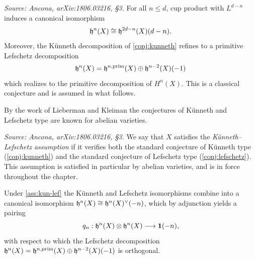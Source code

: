 \begin{conjecture}
  \label{conj:lefschetz}
  \textit{Source: Ancona, arXiv:1806.03216, §3.}
  For all \(n \leq d\), cup product with \(L^{d-n}\) induces a canonical
  isomorphism
  \[\mathfrak{h}^n(X) \cong \mathfrak{h}^{2d-n}(X)(d-n).\]
  Moreover, the K\"unneth decomposition of \cref{conj:kunneth} refines to a
  primitive Lefschetz decomposition
  \[\mathfrak{h}^n(X) = \mathfrak{h}^{n,\mathrm{prim}}(X) \oplus \mathfrak{h}^{n-2}(X)(-1)\]
  which realizes to the primitive decomposition of \(H^n(X)\). This is a
  classical conjecture and is assumed in what follows.
\end{conjecture}

\begin{remark}
  By the work of Lieberman and Kleiman the conjectures of K\"unneth and Lefschetz
  type are known for abelian varieties.
\end{remark}

\begin{definition}
  \label{ass:kun-lef}
  \textit{Source: Ancona, arXiv:1806.03216, §3.}
  We say that \(X\) satisfies the \emph{K\"unneth--Lefschetz assumption} if it
  verifies both the standard conjecture of K\"unneth type (\cref{conj:kunneth})
  and the standard conjecture of Lefschetz type (\cref{conj:lefschetz}). This
  assumption is satisfied in particular by abelian varieties, and is in force
  throughout the chapter.
\end{definition}

\begin{remark}
  Under \cref{ass:kun-lef} the K\"unneth and Lefschetz isomorphisms combine into
  a canonical isomorphism \(\mathfrak{h}^n(X) \cong \mathfrak{h}^{n}(X)^{\vee}(-n)\), which by
  adjunction yields a pairing
  \[q_n : \mathfrak{h}^n(X) \otimes \mathfrak{h}^{n}(X) \longrightarrow \mathbf{1}(-n),\]
  with respect to which the Lefschetz decomposition
  \(\mathfrak{h}^{n}(X) = \mathfrak{h}^{n,\mathrm{prim}}(X) \oplus \mathfrak{h}^{n-2}(X)(-1)\) is orthogonal.
\end{remark}

